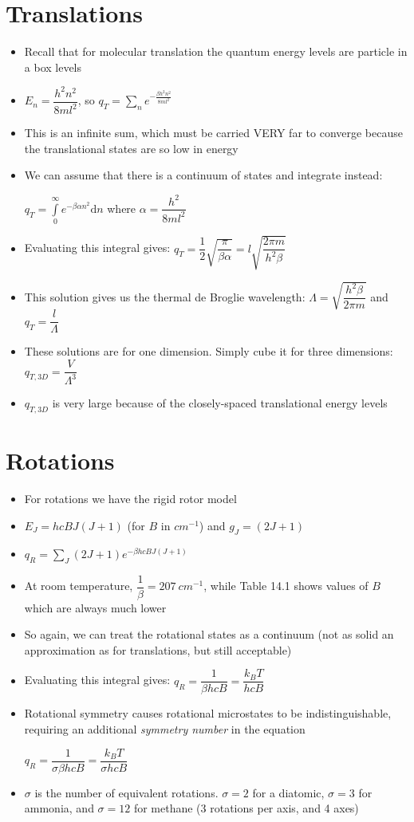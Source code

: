 \documentclass[12pt, openany, letterpaper]{memoir}
\begin{document}
\section*{Translations}
\begin{itemize}
	\item Recall that for molecular translation the quantum energy levels are particle in a box levels
	\item $E_n = \dfrac{h^2n^2}{8ml^2}$, so $q_T=\sum\limits_n e^{-\frac{\beta h^2n^2}{8ml^2}}$
	\item This is an infinite sum, which must be carried VERY far to converge because the translational states are so low in energy
	\item We can assume that there is a continuum of states and integrate instead:
	
	$q_T=\int\limits_0^\infty\!e^{-\beta\alpha n^2}\mathrm{d}n$ where $\alpha = \dfrac{h^2}{8ml^2}$
	\item Evaluating this integral gives: $q_T=\dfrac{1}{2}\sqrt{\dfrac{\pi}{\beta\alpha}}=l\sqrt{\dfrac{2\pi m}{h^2\beta}}$
	\item This solution gives us the thermal de Broglie wavelength: $\Lambda = \sqrt{\dfrac{h^2\beta}{2\pi m}}$ and $q_T=\dfrac{l}{\Lambda}$
	\item These solutions are for one dimension. Simply cube it for three dimensions: $q_{T,3D}=\dfrac{V}{\Lambda^3}$
	\item $q_{T,3D}$ is very large because of the closely-spaced translational energy levels
\end{itemize}
\section*{Rotations}
\begin{itemize}
	\item For rotations we have the rigid rotor model
	\item $E_J=hcBJ(J+1)$ (for $B$ in $cm^{-1}$) and $g_J = (2J+1)$
	\item $q_R = \sum\limits_J(2J+1)e^{-\beta hcBJ(J+1)}$
	\item At room temperature, $\dfrac{1}{\beta}=207~cm^{-1}$, while Table 14.1 shows values of $B$ which are always much lower
	\item So again, we can treat the rotational states as a continuum (not as solid an approximation as for translations, but still acceptable)
	\item Evaluating this integral gives: $q_R=\dfrac{1}{\beta hcB}=\dfrac{k_BT}{hcB}$
	\item Rotational symmetry causes rotational microstates to be indistinguishable, requiring an additional \emph{symmetry number} in the equation
	
	$q_R=\dfrac{1}{\sigma\beta hcB}=\dfrac{k_BT}{\sigma hcB}$
	\item $\sigma$ is the number of equivalent rotations. $\sigma = 2$ for a diatomic, $\sigma = 3$ for ammonia, and $\sigma=12$ for methane (3 rotations per axis, and 4 axes)
\end{itemize}
\end{document}
